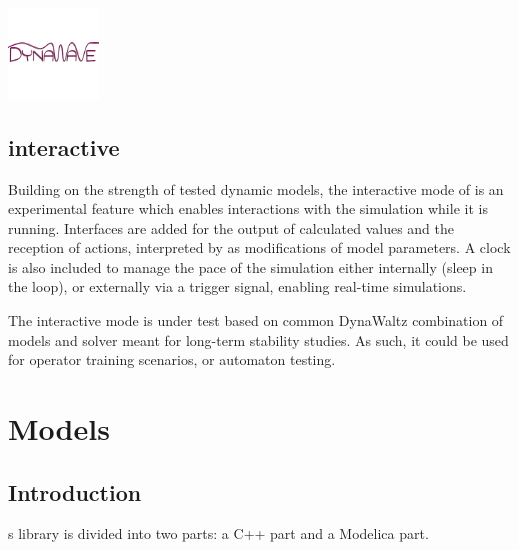 \documentclass[a4paper, 12pt]{report}
\begin{document}
\begin{center}
\includegraphics[width=0.18\textwidth]{../resources/DynaWave.png}
\end{center}

\newpage
\subsection{\Dynawo interactive}

Building on the strength of tested dynamic models, the interactive mode of \Dynawo is an experimental feature which enables interactions with the simulation while it is running. Interfaces are added for the output of calculated values and the reception of actions, interpreted by \Dynawo as modifications of model parameters. A clock is also included to manage the pace of the simulation either internally (sleep in the loop), or externally via a trigger signal, enabling real-time simulations.

The interactive mode is under test based on common DynaWaltz combination of models and solver meant for long-term stability studies. As such, it could be used for operator training scenarios, or automaton testing.

\newpage
\section{Models}

\subsection{Introduction}

\Dynawo\textquotesingle s library is divided into two parts: a C++ part and a Modelica part. \\
\end{document}
